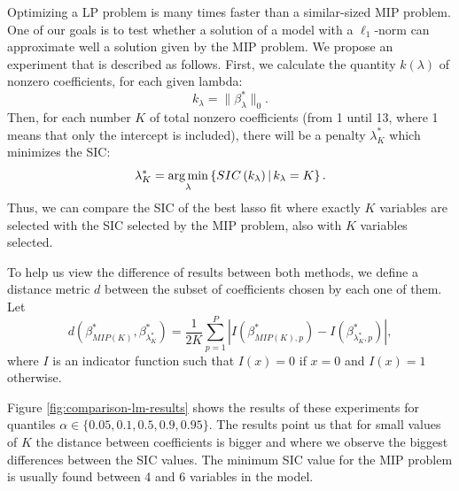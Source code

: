 
Optimizing a LP problem is many times faster than a similar-sized MIP problem. One of our goals is to test whether a solution of a model with a $\ell_1$-norm can approximate well a solution given by the MIP problem. We propose an experiment that is described as follows. First, we calculate the quantity $k(\lambda)$ of nonzero coefficients, for each given lambda:
\begin{equation}
k_\lambda = \| \beta^*_\lambda \|_0.
\end{equation}
Then, for each number $K$ of total nonzero coefficients (from 1 until 13, where 1 means that only the intercept is included), there will be a penalty $\lambda^*_K$ which minimizes the SIC:
\begin{equation}
\lambda^*_K = \operatorname*{arg\,min}_\lambda \left\lbrace  SIC\left( k_\lambda \right)  | \, k_\lambda = K \right\rbrace.
\end{equation}
Thus, we can compare the SIC of the best lasso fit where exactly $K$ variables are selected with the SIC selected by the MIP problem, also with $K$ variables selected.

To help us view the difference of results between both methods, we define a distance metric $d$ between the subset of coefficients chosen by each one of them. Let 
\begin{equation}
d(\beta^*_{MIP(K)}, \beta^*_{\lambda^*_K}) =  \frac{1}{2K} \sum_{p=1}^P { \left| I(\beta^*_{MIP(K),p}) - I( \beta^*_{\lambda^*_K,p}) \right| }, 
\label{eq:distance}
\end{equation}
where $I$ is an indicator function such that $I(x) = 0$ if $x = 0$ and $I(x)=1$ otherwise. 

Figure \ref{fig:comparison-lm-results} shows the results of these experiments for quantiles $\alpha \in \{0.05, 0.1, 0.5, 0.9, 0.95\}$. The results point us that for small values of $K$ the distance between coefficients is bigger and where we observe the biggest differences between the SIC values. The minimum SIC value for the MIP problem is usually found between 4 and 6 variables in the model.


